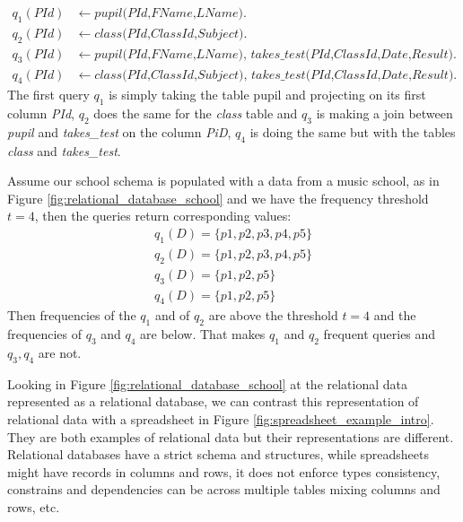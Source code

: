 \begin{equation*}
\begin{aligned}
q_1(\textit{PId})&\leftarrow \textit{pupil(PId,FName,LName)}.\\
q_2(\textit{PId})&\leftarrow \textit{class(PId,ClassId,Subject)}. \\
q_3(\textit{PId})&\leftarrow \textit{pupil(PId,FName,LName), takes\_test(PId,ClassId,Date,Result)}.\\
q_4(\textit{PId})&\leftarrow \textit{class(PId,ClassId,Subject), takes\_test(PId,ClassId,Date,Result)}.
\end{aligned}
\end{equation*}
The first query $q_1$ is simply taking the table pupil and projecting
on its first column \textit{PId}, $q_2$ does the same for the
\textit{class} table and $q_3$ is making a join between \textit{pupil}
and \textit{takes\_test} on the column \textit{PiD}, $q_4$ is doing the same
but with the tables \textit{class} and \textit{takes\_test}.

Assume our school schema is populated with a data from a music school,
as in Figure \ref{fig:relational_database_school} and we have the
frequency threshold $t=4$, then the queries return corresponding
values:
\begin{equation*}
\begin{aligned}
    q_1(D) = \{ p1, p2, p3, p4, p5 \} \\
    q_2(D) = \{ p1, p2, p3, p4, p5 \} \\
    q_3(D) = \{ p1, p2, p5 \} \\
    q_4(D) = \{ p1, p2, p5 \} 
\end{aligned}
\end{equation*}
Then frequencies of the $q_1$ and of $q_2$ are above the threshold $t=4$
and the frequencies of $q_3$ and $q_4$ are below. That makes $q_1$ and
$q_2$ frequent queries and $q_3,q_4$ are not.

Looking in Figure
\ref{fig:relational_database_school} at the relational data represented
as a relational database, we can contrast this representation of
relational data with a spreadsheet in Figure
\ref{fig:spreadsheet_example_intro}. They are both examples of
relational data but their representations are different. 
Relational databases have a strict schema and structures, while
spreadsheets might have records in columns and rows, it does not
enforce types consistency, constrains and dependencies can be across
multiple tables mixing columns and rows, etc.

